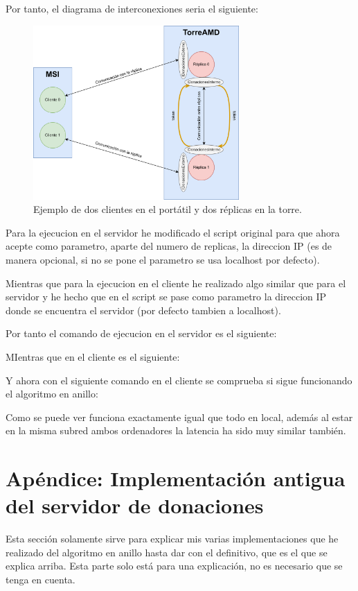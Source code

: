 \documentclass{article}
\begin{document}
Por tanto, el diagrama de interconexiones seria el siguiente:

\begin{figure}[H]
    \centering
    \includegraphics[width=0.7\textwidth]{imagenes/variosOrdenadores.png}
    \caption{Ejemplo de dos clientes en el portátil y dos réplicas en la torre.}
\end{figure}

Para la ejecucion en el servidor he modificado el script original para que ahora acepte como parametro, aparte del numero de replicas, la direccion IP (es de manera opcional, si no se pone el parametro se usa localhost por defecto).

Mientras que para la ejecucion en el cliente he realizado algo similar que para el servidor y he hecho que en el script se pase como parametro la direccion IP donde se encuentra el servidor (por defecto tambien a localhost).


Por tanto el comando de ejecucion en el servidor es el siguiente: 

MIentras que en el cliente es el siguiente: 


Y ahora con el siguiente comando en el cliente se comprueba si sigue funcionando el algoritmo en anillo: %



Como se puede ver funciona exactamente igual que todo en local, además al estar en la misma subred ambos ordenadores la latencia ha sido muy similar también.



\section{Apéndice: Implementación antigua del servidor de donaciones}
Esta sección solamente sirve para explicar mis varias implementaciones que he realizado del algoritmo en anillo hasta dar con el definitivo, que es el que se explica arriba. Esta parte solo está para una explicación, no es necesario que se tenga en cuenta.
\end{document}
